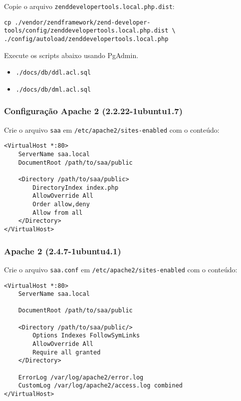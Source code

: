 Copie o arquivo \texttt{zenddevelopertools.local.php.dist}:

\begin{verbatim}
cp ./vendor/zendframework/zend-developer-tools/config/zenddevelopertools.local.php.dist \
./config/autoload/zenddevelopertools.local.php
\end{verbatim}

Execute os scripts abaixo usando PgAdmin.

\begin{itemize}
\itemsep1pt\parskip0pt
\item
  \texttt{./docs/db/ddl.acl.sql}
\item
  \texttt{./docs/db/dml.acl.sql}
\end{itemize}

\subsubsection{Configuração Apache 2
(2.2.22-1ubuntu1.7)}\label{configurauxe7uxe3o-apache-2-2.2.22-1ubuntu1.7}

Crie o arquivo \texttt{saa} em \texttt{/etc/apache2/sites-enabled} com o
conteúdo:

\begin{verbatim}
<VirtualHost *:80>
    ServerName saa.local
    DocumentRoot /path/to/saa/public

    <Directory /path/to/saa/public>
        DirectoryIndex index.php
        AllowOverride All
        Order allow,deny
        Allow from all
    </Directory>
</VirtualHost>
\end{verbatim}

\subsubsection{Apache 2
(2.4.7-1ubuntu4.1)}\label{apache-2-2.4.7-1ubuntu4.1}

Crie o arquivo \texttt{saa.conf} em \texttt{/etc/apache2/sites-enabled}
com o conteúdo:

\begin{verbatim}
<VirtualHost *:80>
    ServerName saa.local

    DocumentRoot /path/to/saa/public

    <Directory /path/to/saa/public/>
        Options Indexes FollowSymLinks
        AllowOverride All
        Require all granted
    </Directory>

    ErrorLog /var/log/apache2/error.log
    CustomLog /var/log/apache2/access.log combined
</VirtualHost>
\end{verbatim}


